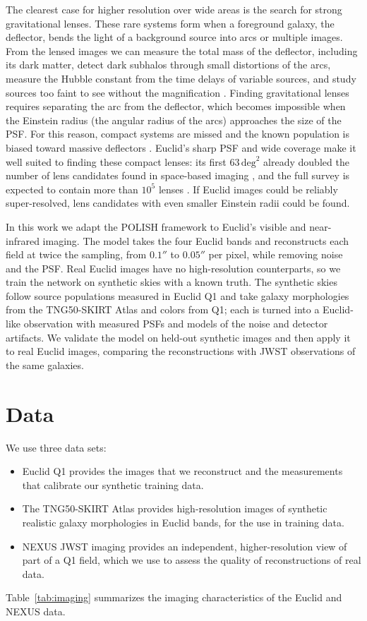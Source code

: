\documentclass[linenumbers,trackchanges,twocolumn]{aastex701}
\begin{document}
The clearest case for higher resolution over wide areas is the search for strong gravitational lenses.
These rare systems form when a foreground galaxy, the deflector, bends the light of a background source into arcs or multiple images.
From the lensed images we can measure the total mass of the deflector, including its dark matter, detect dark subhalos through small distortions of the arcs, measure the Hubble constant from the time delays of variable sources, and study sources too faint to see without the magnification \citep{Treu2010}.
Finding gravitational lenses requires separating the arc from the deflector, which becomes impossible when the Einstein radius (the angular radius of the arcs) approaches the size of the PSF.
For this reason, compact systems are missed and the known population is biased toward massive deflectors \citep{AcevedoBarroso2025}.
Euclid's sharp PSF and wide coverage make it well suited to finding these compact lenses: its first $63\,\mathrm{deg}^2$ already doubled the number of lens candidates found in space-based imaging \citep{Walmsley2025}, and the full survey is expected to contain more than $10^5$ lenses \citep{Collett2015_ApJ81120}.
If Euclid images could be reliably super-resolved, lens candidates with even smaller Einstein radii could be found.

In this work we adapt the POLISH framework to Euclid's visible and near-infrared imaging.
The model takes the four Euclid bands and reconstructs each field at twice the sampling, from $0.1''$ to $0.05''$ per pixel, while removing noise and the PSF.
Real Euclid images have no high-resolution counterparts, so we train the network on synthetic skies with a known truth.
The synthetic skies follow source populations measured in Euclid Q1 and take galaxy morphologies from the TNG50-SKIRT Atlas \citep{Baes2024TNG50SKIRT} and colors from Q1; each is turned into a Euclid-like observation with measured PSFs and models of the noise and detector artifacts.
We validate the model on held-out synthetic images and then apply it to real Euclid images, comparing the reconstructions with JWST observations of the same galaxies.

\section{Data}\label{sec:data}
We use three data sets:\begin{itemize}
    \item Euclid Q1 provides the images that we reconstruct and the measurements that calibrate our synthetic training data.
    \item The TNG50-SKIRT Atlas provides high-resolution images of synthetic realistic galaxy morphologies in Euclid bands, for the use in training data.
    \item NEXUS JWST imaging provides an independent, higher-resolution view of part of a Q1 field, which we use to assess the quality of reconstructions of real data.
\end{itemize}
Table~\ref{tab:imaging} summarizes the imaging characteristics of the Euclid and NEXUS data.
\end{document}
